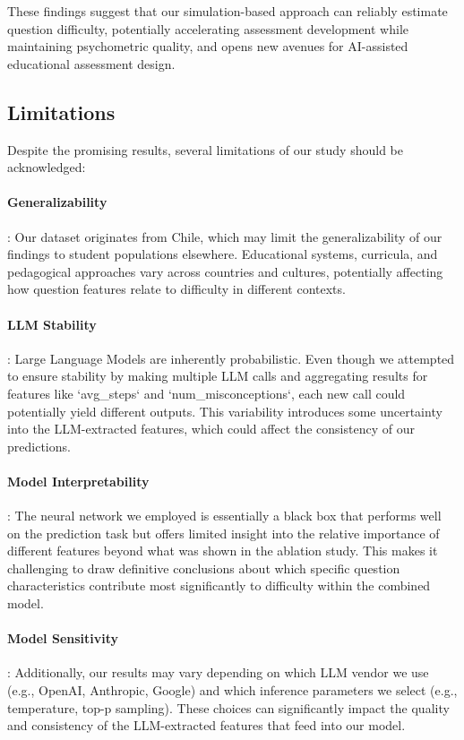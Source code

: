 \documentclass[
    a4paper, %
    10pt, %
    twoside, %
]{LTJournalArticle}
\begin{document}
These findings suggest that our simulation-based approach can reliably estimate question difficulty, potentially accelerating assessment development while maintaining psychometric quality, and opens new avenues for AI-assisted educational assessment design.

\subsection{Limitations}

Despite the promising results, several limitations of our study should be acknowledged:

\paragraph{Generalizability}: Our dataset originates from Chile, which may limit the generalizability of our findings to student populations elsewhere. Educational systems, curricula, and pedagogical approaches vary across countries and cultures, potentially affecting how question features relate to difficulty in different contexts.
    
\paragraph{LLM Stability}: Large Language Models are inherently probabilistic. Even though we attempted to ensure stability by making multiple LLM calls and aggregating results for features like `avg\_steps` and `num\_misconceptions`, each new call could potentially yield different outputs. This variability introduces some uncertainty into the LLM-extracted features, which could affect the consistency of our predictions.
    
\paragraph{Model Interpretability}: The neural network we employed is essentially a black box that performs well on the prediction task but offers limited insight into the relative importance of different features beyond what was shown in the ablation study. This makes it challenging to draw definitive conclusions about which specific question characteristics contribute most significantly to difficulty within the combined model.
    
\paragraph{Model Sensitivity}: Additionally, our results may vary depending on which LLM vendor we use (e.g., OpenAI, Anthropic, Google) and which inference parameters we select (e.g., temperature, top-p sampling). These choices can significantly impact the quality and consistency of the LLM-extracted features that feed into our model.
\end{document}
